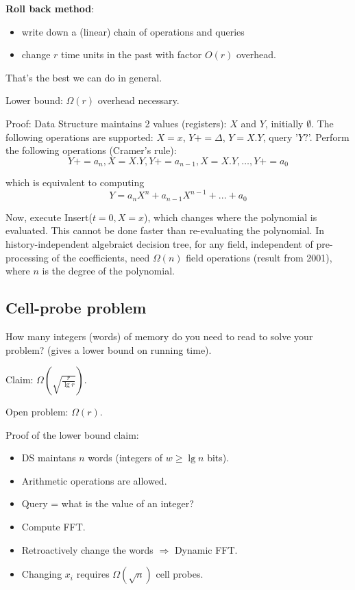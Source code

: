 \documentclass[11pt]{article}
\begin{document}
{\bf Roll back method}: 
\begin{itemize}
\item write down a (linear) chain of operations and queries
\item change $r$ time units in the past with factor $O(r)$ overhead. 
\end{itemize}

That's the best we can do in general. 

Lower bound: $\Omega (r)$ overhead necessary.

Proof: Data Structure maintains 2 values (registers): $X$ and $Y$, initially $\emptyset$. The following operations are supported: $X = x$, $Y += \Delta$, $Y = X.Y$, query '$Y?$'. Perform the following operations (Cramer's rule):
$$Y += a_n, X = X.Y, Y += a_{n-1}, X = X.Y, \ldots, Y += a_0$$


which is equivalent to computing $$Y = a_n X^{n} + a_{n-1} X^{n-1} + ... + a_0$$

Now, execute Insert($t = 0, X=x$), which changes where the polynomial is evaluated. This cannot be done faster than re-evaluating the polynomial. In history-independent algebraict decision tree, for any field, independent of pre-processing of the coefficients, need $\Omega(n)$ field operations (result from 2001), where $n$ is the degree of the polynomial.

\subsection{Cell-probe problem}

How many integers (words) of memory do you need to read to solve your problem? (gives a lower bound on running time).

Claim: $\Omega(\sqrt{\frac{r}{\lg{r}}})$.

Open problem: $\Omega(r)$.

Proof of the lower bound claim:
\begin{itemize}
\item DS maintans $n$ words (integers of $w \ge \lg{n}$ bits). 
\item Arithmetic operations are allowed. 
\item Query = what is the value of an integer?
\item Compute FFT. 
\item Retroactively change the words $\Rightarrow$ Dynamic FFT. 
\item Changing $x_i$ requires $\Omega(\sqrt{n})$ cell probes.
\end{itemize}
\end{document}
